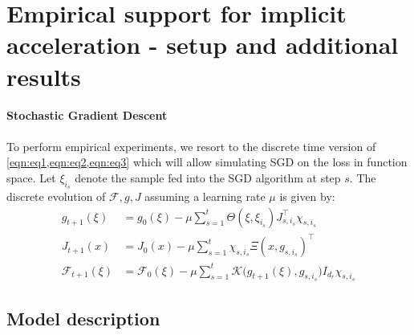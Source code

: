 \documentclass{article}
\theoremstyle{definition}
\theoremstyle{remark}
\renewcommand{\[}{\begin{eqnarray}}
\renewcommand{\]}{\end{eqnarray}}
\renewcommand{\[}{\begin{eqnarray}}
\renewcommand{\]}{\end{eqnarray}}
\newcommand{\F}{\mathcal{F}}
\begin{document}
\section {Empirical support for implicit acceleration - setup and additional results}\label{sec:exp}
\paragraph{Stochastic Gradient Descent}
To perform empirical experiments, we resort to the discrete time version of \cref{eqn:eq1,eqn:eq2,eqn:eq3} which will allow simulating SGD on the loss in function space. Let $\xi_{i_s}$ denote the sample fed into the SGD algorithm at step $s$. The discrete evolution of $\F,g,J$ assuming a learning rate $\mu$ is given by:
\begin{align}
g_{t+1}(\xi) &= g_{0}(\xi) -\mu\sum_{s=1}^t\Theta(\xi,\xi_{i_s})J_{s,i_s}^\top\chi_{s,i_s} \label{eqn:d1}\\
J_{t+1}(x) &= J_{0}(x) -\mu\sum_{s=1}^t \chi_{s,i_s}\Xi(x,g_{s,i_s})^\top \label{eqn:d2}\\
\F_{t+1}(\xi) &= \F_{0}(\xi) -\mu\sum_{s=1}^t\mathcal{K}\big(g_{t+1}(\xi),g_{s,i_s}\big)I_{d_r}\chi_{s,i_s} \label{eqn:d3}
\end{align}

\subsection{Model description} 
\end{document}
